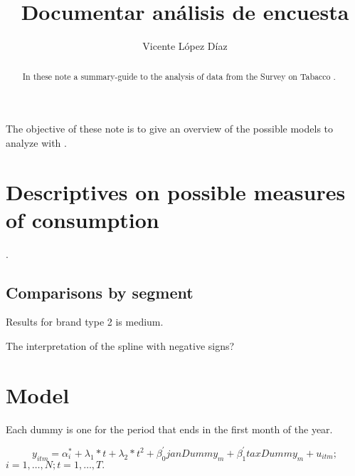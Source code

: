 \documentclass[]{article}
\title{Documentar análisis de encuesta}
\author{Vicente López Díaz}
\begin{document}
\maketitle

\begin{abstract}
In these note a summary-guide to the analysis of data from the Survey on Tabacco .
\end{abstract}

The objective of these note is to give an overview of the possible models to analyze with .


\section{Descriptives on possible measures of consumption}
. 


\subsection{Comparisons by segment}
Results for brand type 2 is medium.

The interpretation of the spline with negative signs?



\section{Model}
Each dummy is one for the period that ends in the first month of the year. 

\begin{equation*} 
y_{itm}  = \alpha_{i}^{*} + \lambda_{1}*t +  \lambda_{2}*t^{2} +\beta_{0}^{'}janDummy_{m} + \beta_{1}^{'}taxDummy_{m} + u_{itm}
;  
\end{equation*}
$i  = 1,\ldots,N;  t=1,\ldots,T. $
\end{document}
